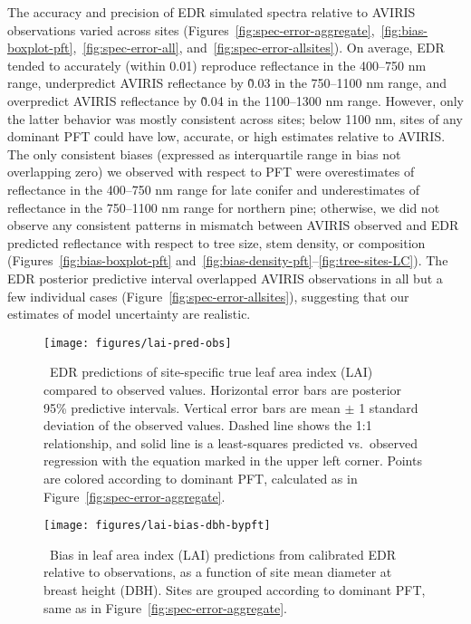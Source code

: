 The accuracy and precision of EDR simulated spectra relative to AVIRIS observations varied across sites (Figures~\ref{fig:spec-error-aggregate},~\ref{fig:bias-boxplot-pft},~\ref{fig:spec-error-all}, and~\ref{fig:spec-error-allsites}).
On average, EDR tended to accurately (within 0.01) reproduce reflectance in the 400--750 \unit{nm} range, underpredict AVIRIS reflectance by \~0.03 in the 750--1100 \unit{nm} range, and overpredict AVIRIS reflectance by \~0.04 in the 1100--1300 \unit{nm} range.
However, only the latter behavior was mostly consistent across sites;
below 1100 \unit{nm}, sites of any dominant PFT could have low, accurate, or high estimates relative to AVIRIS.\@
The only consistent biases (expressed as interquartile range in bias not overlapping zero) we observed with respect to PFT were
overestimates of reflectance in the 400--750 \unit{nm} range for late conifer
and
underestimates of reflectance in the 750--1100 \unit{nm} range for northern pine;
otherwise, we did not observe any consistent patterns in mismatch between AVIRIS observed and EDR predicted reflectance with respect to tree size, stem density, or composition (Figures~\ref{fig:bias-boxplot-pft} and~\ref{fig:bias-density-pft}--\ref{fig:tree-sites-LC}).
The EDR posterior predictive interval overlapped AVIRIS observations in all but a few individual cases (Figure~\ref{fig:spec-error-allsites}), suggesting that our estimates of model uncertainty are realistic.

\begin{figure}
  \centering
  \texttt{[image: figures/lai-pred-obs]}
  \caption{\
    EDR predictions of site-specific true leaf area index (LAI) compared to observed values.
    Horizontal error bars are posterior 95\% predictive intervals.
    Vertical error bars are mean $\pm$ 1 standard deviation of the observed values.
    Dashed line shows the 1:1 relationship, and solid line is a least-squares predicted vs.\ observed regression with the equation marked in the upper left corner.
    Points are colored according to dominant PFT, calculated as in Figure~\ref{fig:spec-error-aggregate}.
  }\label{fig:lai-pred-obs}
\end{figure}

\begin{figure}
  \centering
  \texttt{[image: figures/lai-bias-dbh-bypft]}
  \caption{\
    Bias in leaf area index (LAI) predictions from calibrated EDR relative to observations,
    as a function of site mean diameter at breast height (DBH).
    Sites are grouped according to dominant PFT, same as in Figure~\ref{fig:spec-error-aggregate}.
  }\label{fig:lai-bias-dbh-bypft}
\end{figure}

